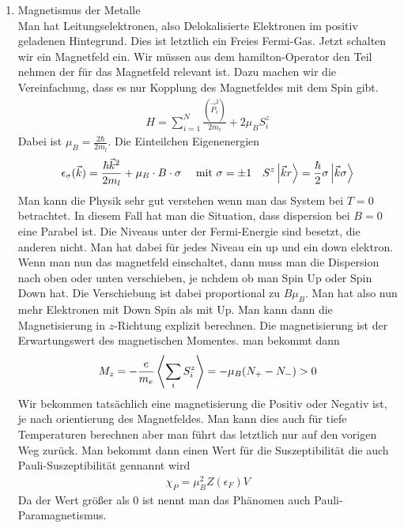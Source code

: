 \begin{description}
\begin{enumerate}[1)]
      \item Magnetismus der Metalle \\
        Man hat Leitungselektronen, also Delokalisierte Elektronen im positiv
        geladenen Hintegrund. Dies ist letztlich ein Freies Fermi-Gas.
        Jetzt schalten wir ein Magnetfeld ein. Wir müssen aus dem hamilton-Operator
        den Teil nehmen der für das Magnetfeld relevant ist. Dazu machen wir die
        Vereinfachung, dass es nur Kopplung des Magnetfeldes mit dem Spin
        gibt.
        \begin{align*}
          H = \sum_{i=1}^{N} 
          \frac{(\vec{P}_i^2)}{2 m_i} + 2 \mu_B S_i^z
        \end{align*}
        Dabei ist $\mu_B = \frac{2 \hbar}{2 m_l}$. Die Einteilchen Eigenenergien
        \begin{align*}
          \epsilon_\sigma(\vec{k}) = \frac{\hbar \vec{k}^2}{2 m_l} + \mu_B \cdot B \cdot \sigma
          && \text{ mit } \sigma = \pm 1 && S^z \Ket{\vec{k} r} = \frac{\hbar}{2} 
          \sigma \Ket{\vec{k} \sigma}
        \end{align*}
        Man kann die Physik sehr gut verstehen wenn man das System bei $T=0$ betrachtet.
        In diesem Fall hat man die Situation, dass dispersion bei $B=0$ eine Parabel ist.
        Die Niveaus unter der Fermi-Energie sind besetzt, die anderen nicht.
        Man hat dabei für jedes Niveau ein up und ein down elektron. Wenn
        man nun das magnetfeld einschaltet, dann muss man die Dispersion nach
        oben oder unten verschieben, je nchdem ob man Spin Up oder Spin Down hat.
        Die Verschiebung ist dabei proportional zu $B \mu_B$. Man hat also nun
        mehr Elektronen mit Down Spin als mit Up. Man kann dann die Magnetisierung
        in $z$-Richtung explizit berechnen. Die magnetisierung ist
        der Erwartungswert des magnetischen Momentes. man bekommt dann
        \begin{align*}
          M_z  = - \frac{e}{m_e} \Braket{\sum_{i}^{} S_i^z} = 
          - \mu_B (N_+ - N_-) > 0
        \end{align*}
        Wir bekommen tatsächlich eine magnetisierung die Positiv oder Negativ ist, 
        je nach orientierung des Magnetfeldes. Man kann dies auch für tiefe Temperaturen
        berechnen aber man führt das letztlich nur auf den vorigen Weg zurück.
        Man bekommt dann einen Wert für die Suszeptibilität die auch
        Pauli-Suszeptibilität gennannt wird
        \begin{align*}
          \chi_P = \mu_B^2 Z(\epsilon_F) V
        \end{align*}
        Da der Wert größer als 0 ist nennt man das Phänomen
        auch Pauli-Paramagnetismus.


\end{enumerate}
\end{description}
